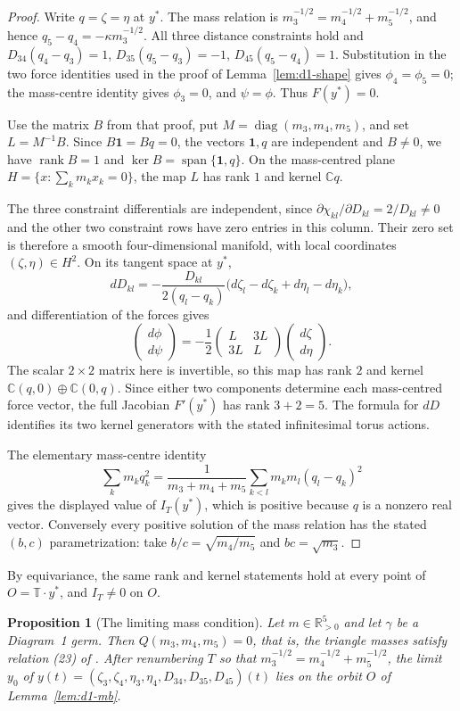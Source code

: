 \documentclass[Threeside,11pt]{article}
\newtheorem{proposition}[theorem]{Proposition}
\theoremstyle{definition}
\theoremstyle{remark}
\numberwithin{equation}{section}
\newcommand{\C}{\mathbb C}\newcommand{\T}{\mathbb T}
\theoremstyle{remark}
\newcommand{\Rp}{\mathbb{R}_{>0}}
\begin{document}
{\begin{proof}
Write $q=\zeta=\eta$ at $y^*$.  The mass relation is
$m_3^{-1/2}=m_4^{-1/2}+m_5^{-1/2}$, and hence
$q_5-q_4=-\kappa m_3^{-1/2}$.  All three distance constraints hold and
$D_{34}(q_4-q_3)=1$, $D_{35}(q_5-q_3)=-1$,
$D_{45}(q_5-q_4)=1$.
Substitution in the two force identities used in the proof of
Lemma~\ref{lem:d1-shape} gives $\phi_4=\phi_5=0$; the mass-centre identity
gives $\phi_3=0$, and $\psi=\phi$.  Thus $F(y^*)=0$.

Use the matrix $B$ from that proof, put $M=\operatorname{diag}(m_3,m_4,m_5)$,
and set $L=M^{-1}B$.
Since $B\mathbf1=Bq=0$, the vectors $\mathbf1,q$ are independent and
$B\ne0$, we have $\operatorname{rank}B=1$ and
$\ker B=\operatorname{span}\{\mathbf1,q\}$.
On the mass-centred plane
$H=\{x:\sum_km_kx_k=0\}$, the map $L$ has rank $1$ and kernel $\C q$.

The three constraint differentials are independent, since
$\partial\chi_{kl}/\partial D_{kl}=2/D_{kl}\ne0$ and the other two
constraint rows have zero entries in this column.  Their zero set is therefore
a smooth four-dimensional manifold, with local coordinates $(\zeta,\eta)\in H^2$.
On its tangent space at $y^*$,
\[
 dD_{kl}=-\frac{D_{kl}}{2(q_l-q_k)}
   \bigl(d\zeta_l-d\zeta_k+d\eta_l-d\eta_k\bigr),
\]
and differentiation of the forces gives
\[
 \begin{pmatrix}d\phi\\d\psi\end{pmatrix}
 =-\frac12
 \begin{pmatrix}L&3L\\3L&L\end{pmatrix}
 \begin{pmatrix}d\zeta\\d\eta\end{pmatrix}.
\]
The scalar $2\times2$ matrix here is invertible, so this map has rank $2$
and kernel $\C(q,0)\oplus\C(0,q)$.  Since either two components determine
each mass-centred force vector, the full Jacobian $F'(y^*)$ has rank
$3+2=5$.  The formula for $dD$ identifies its two kernel generators with
the stated infinitesimal torus actions.

The elementary mass-centre identity
\[
 \sum_km_kq_k^2=\frac1{m_3+m_4+m_5}
       \sum_{k<l}m_km_l(q_l-q_k)^2
\]
gives the displayed value of $I_T(y^*)$, which is positive because $q$ is
a nonzero real vector.  Conversely every positive solution of the mass
relation has the stated $(b,c)$ parametrization: take
$b/c=\sqrt{m_4/m_5}$ and $bc=\sqrt{m_3}$.
\end{proof}
By equivariance, the same rank and kernel statements hold at every point of
$O=\mathbb T\cdot y^*$, and $I_T\ne0$ on $O$.

}\begin{proposition}[The limiting mass condition]\label{prop:d1-first}
Let $m\in\Rp^5$ and let $\gamma$ be a Diagram~1 germ.  Then $Q(m_3,m_4,m_5)=0$, that is, the
triangle masses satisfy relation (23) of \cite[\S8.1]{AK}.  After renumbering $T$ so that
$m_3^{-1/2}=m_4^{-1/2}+m_5^{-1/2}$, the limit $y_0$ of
$y(t)=(\zeta_3,\zeta_4,\eta_3,\eta_4,D_{34},D_{35},D_{45})(t)$ lies on the orbit $O$ of
Lemma~\ref{lem:d1-mb}.
\end{proposition}
\end{document}

